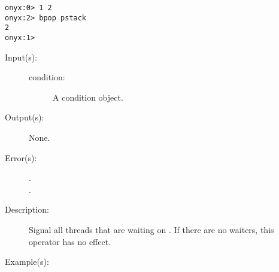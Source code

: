 \begin{description}
\begin{description}
\begin{verbatim}
onyx:0> 1 2
onyx:2> bpop pstack
2
onyx:1>
		\end{verbatim}
	\end{description}
\label{systemdict:broadcast}
\item[{\onyxop{condition}{broadcast}{--}}: ]
	\begin{description}\item[]
	\item[Input(s): ]
		\begin{description}\item[]
		\item[condition: ]
			A condition object.
		\end{description}
	\item[Output(s): ] None.
	\item[Error(s): ]
		\begin{description}\item[]
		\item[.]
		\item[.]
		\end{description}
	\item[Description: ]
		Signal all threads that are waiting on .  If
		there are no waiters, this operator has no effect.
	\item[Example(s): ]\begin{verbatim}


\end{verbatim}
\end{description}
\end{description}

